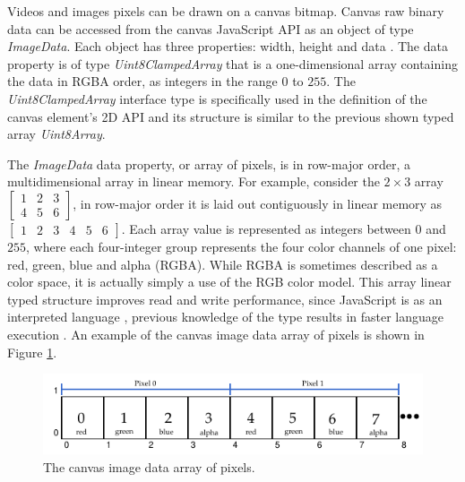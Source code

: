  Videos and images pixels can be drawn on a canvas bitmap. Canvas raw binary data can be accessed from the canvas JavaScript API as an object of type \textit{ImageData}. Each object has three properties: width, height and data \cite{Canvas2013,MDN2013}. The data property is of type \textit{Uint8ClampedArray} \cite{TypedArray2013} that is a one-dimensional array containing the data in RGBA \cite{Gonzalez2007} order, as integers in the range $0$ to $255$. The \textit{Uint8ClampedArray} interface type is specifically used in the definition of the canvas element's 2D API and its structure is  similar to the previous shown typed array \textit{Uint8Array}.

The \textit{ImageData} data property, or array of pixels, is in row-major order, a multidimensional array in linear memory. For example, consider the $2\times3$ array $\begin{bmatrix}
1 & 2 & 3\\
4 & 5 & 6
\end{bmatrix}$, in row-major order it is laid out contiguously in linear memory as $\begin{bmatrix}
1 & 2 & 3 & 4 & 5 & 6
\end{bmatrix}$. Each array value is represented as integers between $0$ and $255$, where each four-integer group represents the four color channels of one pixel: red, green, blue and alpha (RGBA). While RGBA is sometimes described as a color space, it is actually simply a use of the RGB color model. This array linear typed structure improves read and write performance, since JavaScript is as an interpreted language \cite{MDN2013}, previous knowledge of the type results in faster language execution \cite{TypedArray2013}. An example of the canvas image data array of pixels is shown in Figure \ref{figure:imagedata_array}.

\begin{figure}[!htb]
  \centering
  \includegraphics[width=\linewidth]{chapters/basic_concepts/imagedata_array.pdf}
  \caption{The canvas image data array of pixels.}
  \label{figure:imagedata_array}
\end{figure}


